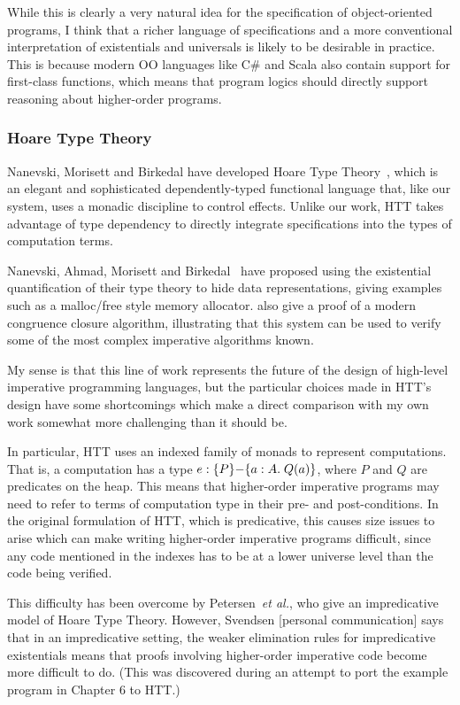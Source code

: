 While this is clearly a very natural idea for the specification of
object-oriented programs, I think that a richer language of
specifications and a more conventional interpretation of existentials
and universals is likely to be desirable in practice. This is because
modern OO languages like C\# and Scala also contain support for
first-class functions, which means that program logics should directly
support reasoning about higher-order programs.

\subsubsection{Hoare Type Theory}

Nanevski, Morisett and Birkedal have developed Hoare Type
Theory~\cite{htt, nanevski08}, which is an elegant and sophisticated
dependently-typed functional language that, like our system, uses a
monadic discipline to control effects.  Unlike our work, HTT takes
advantage of type dependency to directly integrate specifications into
the types of computation terms.

Nanevski, Ahmad, Morisett and Birkedal~\cite{abstract-htt} have
proposed using the existential quantification of their type theory to
hide data representations, giving examples such as a malloc/free style
memory allocator. \citet{nanevski-victor-10} also give
a proof of a modern congruence closure algorithm, illustrating that
this system can be used to verify some of the most complex imperative
algorithms known.

My sense is that this line of work represents the future of the design
of high-level imperative programming languages, but the particular
choices made in HTT's design have some shortcomings which make a
direct comparison with my own work somewhat more challenging than it
should be.

In particular, HTT uses an indexed family of monads to represent
computations.  That is, a computation has a type $e :
\{{P}\}{-}\{{a:A}.\;{Q(a)}\}$, where $P$ and $Q$ are predicates on the
heap. This means that higher-order imperative programs may need to
refer to terms of computation type in their pre- and post-conditions.
In the original formulation of HTT, which is predicative, this causes
size issues to arise which can make writing higher-order imperative
programs difficult, since any code mentioned in the indexes has to be
at a lower universe level than the code being verified.

This difficulty has been overcome by Petersen~\emph{et al.}, who give
an impredicative model of Hoare Type Theory. However, Svendsen
[personal communication] says that in an impredicative setting, the
weaker elimination rules for impredicative existentials means that
proofs involving higher-order imperative code become more difficult to
do. (This was discovered during an attempt to port the example program
in Chapter 6 to HTT.)

